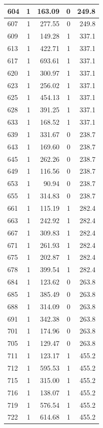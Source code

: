 \documentclass[
  12pt,
]{book}
\begin{document}
\begin{tabular}{l|r|r|r|r}
\hline
604 & 1 & 163.09 & 0 & 249.8\\
\hline
607 & 1 & 277.55 & 0 & 249.8\\
\hline
609 & 1 & 149.28 & 1 & 337.1\\
\hline
613 & 1 & 422.71 & 1 & 337.1\\
\hline
617 & 1 & 693.61 & 1 & 337.1\\
\hline
620 & 1 & 300.97 & 1 & 337.1\\
\hline
623 & 1 & 256.02 & 1 & 337.1\\
\hline
625 & 1 & 454.13 & 1 & 337.1\\
\hline
628 & 1 & 391.25 & 1 & 337.1\\
\hline
633 & 1 & 168.52 & 1 & 337.1\\
\hline
639 & 1 & 331.67 & 0 & 238.7\\
\hline
643 & 1 & 169.60 & 0 & 238.7\\
\hline
645 & 1 & 262.26 & 0 & 238.7\\
\hline
649 & 1 & 116.56 & 0 & 238.7\\
\hline
653 & 1 & 90.94 & 0 & 238.7\\
\hline
655 & 1 & 314.83 & 0 & 238.7\\
\hline
661 & 1 & 115.19 & 1 & 282.4\\
\hline
663 & 1 & 242.92 & 1 & 282.4\\
\hline
667 & 1 & 309.83 & 1 & 282.4\\
\hline
671 & 1 & 261.93 & 1 & 282.4\\
\hline
675 & 1 & 202.87 & 1 & 282.4\\
\hline
678 & 1 & 399.54 & 1 & 282.4\\
\hline
684 & 1 & 123.62 & 0 & 263.8\\
\hline
685 & 1 & 385.49 & 0 & 263.8\\
\hline
688 & 1 & 314.09 & 0 & 263.8\\
\hline
691 & 1 & 342.38 & 0 & 263.8\\
\hline
701 & 1 & 174.96 & 0 & 263.8\\
\hline
705 & 1 & 129.47 & 0 & 263.8\\
\hline
711 & 1 & 123.17 & 1 & 455.2\\
\hline
712 & 1 & 595.53 & 1 & 455.2\\
\hline
715 & 1 & 315.00 & 1 & 455.2\\
\hline
716 & 1 & 138.07 & 1 & 455.2\\
\hline
719 & 1 & 576.54 & 1 & 455.2\\
\hline
722 & 1 & 614.68 & 1 & 455.2\\

\end{tabular}
\end{document}
